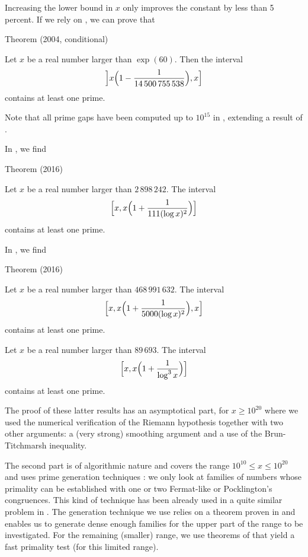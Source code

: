 Increasing the lower bound in $x$ only improves the constant by less than 5
percent. If we rely on
\cite{Gourdon-Demichel*04},
we can prove
that

\begin{thm}{Theorem (2004, conditional)}

Let $x$ be a real number larger than $\exp(60)$. Then the interval
$$
\Bigl] x \Bigl(1-\frac1{14\,500\,755\,538}\Bigr),x \Bigr]
$$
contains at least one prime.
\end{thm}


Note that all prime gaps have been computed up
to $10^{15}$ in
\cite{Nicely*99}, extending a
result of
\cite{Young-Potler*89}.

In
\cite{Trudgian*16},
we find
\begin{thm}{Theorem (2016)}

Let $x$ be a real number larger than $2\,898\,242$. The interval
$$
\Bigl[ x, x \Bigl(1+\frac1{111(\log x)^2}\Bigr) \Bigr]
$$
contains at least one prime.
\end{thm}

In
\cite{Dusart*16},
we find
\begin{thm}{Theorem (2016)}

Let $x$ be a real number larger than $468\,991\,632$. The interval
$$
\Bigl[ x, x \Bigl(1+\frac1{5000(\log x)^2}\Bigr),x \Bigr]
$$
contains at least one prime.
\par 

  Let $x$ be a real number larger than $89\,693$. The interval
$$
\Bigl[ x, x \Bigl(1+\frac1{\log^3 x}\Bigr) \Bigr]
$$
contains at least one prime.
\end{thm}


The proof of these latter results has an asymptotical part, for $x\ge 10^{20}$ where we used the
numerical verification of the Riemann hypothesis together with two other
arguments: a (very strong) smoothing argument and a use of the Brun-Titchmarsh
inequality.

The second part is of algorithmic nature and covers the range $10^{10} \le x \le
10^{20}$ and uses prime generation
techniques
\cite{Maurer*95}:
we only look at families of numbers whose primality can be established with
one or two Fermat-like or Pocklington's congruences. This kind of technique
has been already used in a quite similar problem in
\cite{Deshouillers-teRiele-Saouter*98}.
The generation technique we
use relies on a theorem proven in
\cite{Brillhart-Lehmer-Selfridge*75}
and enables us to generate dense
enough families for the upper part of the range to be investigated. For the
remaining (smaller) range, we use theorems of
\cite{Jaeschke*93}
that yield a fast primality test (for this limited range).

